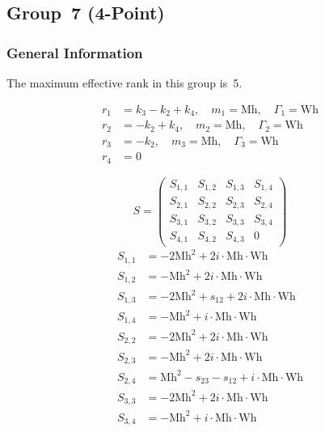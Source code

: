 \documentclass[a4paper]{article}
\begin{document}
\begin{longtable}{cc}
\end{longtable}


\subsection{Group~7 (4-Point)}
\subsubsection*{General Information}
The maximum effective rank in this group is~5.

\begin{subequations}
\begin{align}
r_{1} &= k_{3}-k_{2}+k_{4},\quad m_{1} = \text{Mh},\quad \Gamma_{1} = \text{Wh}\\
r_{2} &= -k_{2}+k_{4},\quad m_{2} = \text{Mh},\quad \Gamma_{2} = \text{Wh}\\
r_{3} &= -k_{2},\quad m_{3} = \text{Mh},\quad \Gamma_{3} = \text{Wh}\\
r_{4} &= 0
\end{align}
\end{subequations}

\begin{equation}
S=\left(\begin{array}{cccc}
   S_{1,1}&
   S_{1,2}&
   S_{1,3}&
   S_{1,4}\\
   S_{2,1}&
   S_{2,2}&
   S_{2,3}&
   S_{2,4}\\
   S_{3,1}&
   S_{3,2}&
   S_{3,3}&
   S_{3,4}\\
   S_{4,1}&
   S_{4,2}&
   S_{4,3}&
   0\end{array}\right)
\end{equation}
\begin{subequations}
\begin{align}
   S_{1,1}&=-2\text{Mh}^2+2i\cdot{}\text{Mh}\cdot{}\text{Wh}\\
   S_{1,2}&=-\text{Mh}^2+2i\cdot{}\text{Mh}\cdot{}\text{Wh}\\
   S_{1,3}&=-2\text{Mh}^2+s_{12}+2i\cdot{}\text{Mh}\cdot{}\text{Wh}\\
   S_{1,4}&=-\text{Mh}^2+i\cdot{}\text{Mh}\cdot{}\text{Wh}\\
   S_{2,2}&=-2\text{Mh}^2+2i\cdot{}\text{Mh}\cdot{}\text{Wh}\\
   S_{2,3}&=-\text{Mh}^2+2i\cdot{}\text{Mh}\cdot{}\text{Wh}\\
   S_{2,4}&=\text{Mh}^2-s_{23}-s_{12}+i\cdot{}\text{Mh}\cdot{}\text{Wh}\\
   S_{3,3}&=-2\text{Mh}^2+2i\cdot{}\text{Mh}\cdot{}\text{Wh}\\
   S_{3,4}&=-\text{Mh}^2+i\cdot{}\text{Mh}\cdot{}\text{Wh}
\end{align}
\end{subequations}
\end{document}
